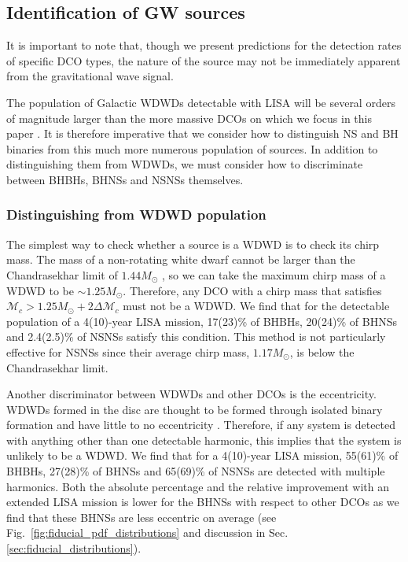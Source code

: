 \subsection{Identification of GW sources}
It is important to note that, though we present predictions for the detection rates of specific DCO types, the nature of the source may not be immediately apparent from the gravitational wave signal.

The population of Galactic WDWDs detectable with LISA will be several orders of magnitude larger than the more massive DCOs on which we focus in this paper \citep[e.g.][]{Korol+2017}. It is therefore imperative that we consider how to distinguish NS and BH binaries from this much more numerous population of sources. In addition to distinguishing them from WDWDs, we must consider how to discriminate between BHBHs, BHNSs and NSNSs themselves.

\subsubsection{Distinguishing from WDWD population}\label{sec:WDWD_distinguish}
The simplest way to check whether a source is a WDWD is to check its chirp mass. The mass of a non-rotating white dwarf cannot be larger than the Chandrasekhar limit of $1.44 \unit{M_\odot}$ \citep{Chandrasekhar+1931}, so we can take the maximum chirp mass of a WDWD to be $\sim 1.25 \unit{M_{\odot}}$. Therefore, any DCO with a chirp mass that satisfies $\mathcal{M}_c > 1.25 \unit{M_{\odot}} + 2 \Delta \mathcal{M}_c$ must not be a WDWD. We find that for the detectable population of a 4(10)-year LISA mission, 17(23)\% of BHBHs, 20(24)\% of BHNSs and 2.4(2.5)\% of NSNSs satisfy this condition. This method is not particularly effective for NSNSs since their average chirp mass, $1.17 \unit{M_\odot}$, is below the Chandrasekhar limit.

Another discriminator between WDWDs and other DCOs is the eccentricity. WDWDs formed in the disc are thought to be formed through isolated binary formation and have little to no eccentricity \citep[e.g.][]{Nelemans+2001}. Therefore, if any system is detected with anything other than one detectable harmonic, this implies that the system is unlikely to be a WDWD. We find that for a 4(10)-year LISA mission, 55(61)\% of BHBHs, 27(28)\% of BHNSs and 65(69)\% of NSNSs are detected with multiple harmonics. Both the absolute percentage and the relative improvement with an extended LISA mission is lower for the BHNSs with respect to other DCOs as we find that these BHNSs are less eccentric on average (see Fig.~\ref{fig:fiducial_pdf_distributions} and discussion in Sec. \ref{sec:fiducial_distributions}).


